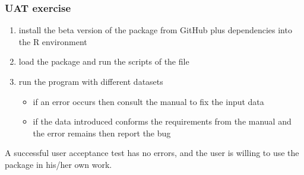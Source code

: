 \documentclass[oneside,a4paper]{memoir} %
\begin{document}
\subsubsection{UAT exercise}

\begin{enumerate}
	\item install the beta version of the package from GitHub plus dependencies into the R environment  
	\item load the package and run the scripts of the  file
	\item run the program with different datasets
	\begin{itemize}\small
		\item if an error occurs then consult the manual to fix the input data
		\item if the data introduced conforms the requirements from the manual and the error remains then report the bug
	\end{itemize}
\end{enumerate}

\bigbreak
\noindent
A successful user acceptance test has no errors, and the user is willing to use the package in his/her own work. 
\end{document}
